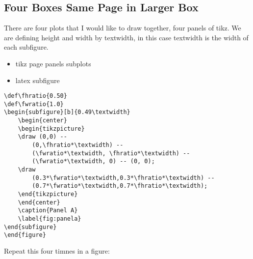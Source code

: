 \documentclass{article}
\begin{document}
\subsection{Four Boxes Same Page in Larger Box}
There are four plots that I would like to draw together, four panels of tikz. We are defining height and width by textwidth, in this case textwidth is the width of each subfigure. 

\begin{itemize}
    \item tikz page panels subplots
    \item latex subfigure
\end{itemize}

\begin{verbatim}
\def\fhratio{0.50}
\def\fwratio{1.0}
\begin{subfigure}[b]{0.49\textwidth}
    \begin{center}
    \begin{tikzpicture}
    \draw (0,0) -- 
        (0,\fhratio*\textwidth) -- 
        (\fwratio*\textwidth, \fhratio*\textwidth) -- 
        (\fwratio*\textwidth, 0) -- (0, 0);
    \draw 
        (0.3*\fwratio*\textwidth,0.3*\fhratio*\textwidth) -- 
        (0.7*\fwratio*\textwidth,0.7*\fhratio*\textwidth);
    \end{tikzpicture}
    \end{center}
    \caption{Panel A}
    \label{fig:panela}
\end{subfigure}
\end{figure}
\end{verbatim}
Repeat this four timnes in a figure:
\def\fhratio{0.50}
\def\fwratio{1.0}
\end{document}
